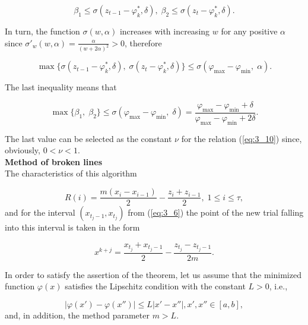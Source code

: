 	\begin{equation*}
	\beta _{1} \le \sigma (z_{t-1} -\varphi _{k}^{*} ,\delta ),\; \beta _{2} \le \sigma (z_{t} -\varphi _{k}^{*} ,\delta ).
	\end{equation*}
	
	In turn, the function $\sigma (w,\alpha )$ increases with increasing $w$ for any positive $\alpha$ since $\sigma '_{w} (w,\alpha )=\frac{\alpha }{(w+2\alpha )^{2} } >0$, therefore 
	
	\begin{equation*}
	\max \{ \sigma (z_{t-1} -\varphi _{k}^{*} ,\delta ),\; \sigma (z_{t} -\varphi _{k}^{*} ,\delta )\} \le \sigma (\varphi _{\max } -\varphi _{\min } ,\; \alpha ). 
	\end{equation*}
	
	The last inequality means that 
	
	\begin{equation*}
	\max \{ \beta _{1} ,\; \beta _{2} \} \le \sigma (\varphi _{\max } -\varphi _{\min } ,\; \delta )=\frac{\varphi _{\max } -\varphi _{\min } +\delta }{\varphi _{\max } -\varphi _{\min } +2\delta }. 
	\end{equation*}
	
	The last value can be selected as the constant $\nu$  for the relation  (\ref{eq:3_10}) since, obviously, $0<\nu <1$. \\
	
	\textbf{Method of broken lines \cite{3_Piyavskij, 3_Shubert}} \\
	
	The characteristics of this algorithm
	
	\begin{equation}
	\label{eq:3_16}
	R(i)=\frac{m(x_{i} -x_{i-1} )}{2} -\frac{z_{i} +z_{i-1} }{2} ,\; 1\le i\le \tau,
	\end{equation}
	and for the interval $(x_{t_{j} -1} ,x_{t_{j} } )$ from  (\ref{eq:3_6}) the point  of the new trial falling into this interval is taken in the form
	
	\begin{equation}
	\label{eq:3_17}
	x^{k+j} =\frac{x_{t_{j} } +x_{t_{j} -1} }{2} -\frac{z_{t_{j} } -z_{t_{j} -1} }{2m}.
	\end{equation}
	
	In order to satisfy the assertion of the theorem, let us assume that the minimized function $\varphi(x)$ satisfies the Lipschitz condition with the constant $L>0$, i.e.,
	
	\begin{equation}
	\label{eq:3_18}
	\left|\varphi (x')-\varphi (x'')\right|\le L\left|x'-x''\right|,x',x''\in [a,b],
	\end{equation}	
	and, in addition, the method parameter $m>L$. 
	
